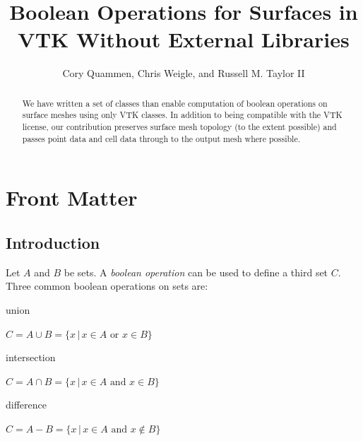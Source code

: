 \documentclass{InsightArticle}
\title{Boolean Operations for Surfaces in VTK Without External Libraries}
\author{Cory Quammen, Chris Weigle, and Russell M. Taylor II}
\newcommand{\IJhandlerIDnumber}{1338}
\begin{document}
%
% 
\IJhandlefooter{\IJhandlerIDnumber}


\ifpdf
\else
\fi


\maketitle


\ifhtml
\chapter*{Front Matter\label{front}}
\fi


\begin{abstract}
\noindent
We have written a set of classes than enable computation of boolean operations on surface meshes using only VTK classes. In addition to being compatible with the VTK license, our contribution preserves surface mesh topology (to the extent possible) and passes point data and cell data through to the output mesh where possible.

\end{abstract}

\IJhandlenote{\IJhandlerIDnumber}

\tableofcontents

\section{Introduction}
\label{sec:Introduction}

Let $A$ and $B$ be sets. A \emph{boolean operation} can be used to define a third set $C$. Three common boolean operations on sets are:

\begin{description}

\item union

 $C = A \cup B = \{ x \, | \, x \in A \text{ or } x \in B \}$

\item intersection

$C = A \cap B = \{ x \, | \, x \in A \text{ and } x \in B \}$

\item difference

$C = A - B = \{ x \, | \, x \in A \text{ and } x \notin B \}$

\end{description}
\end{document}
